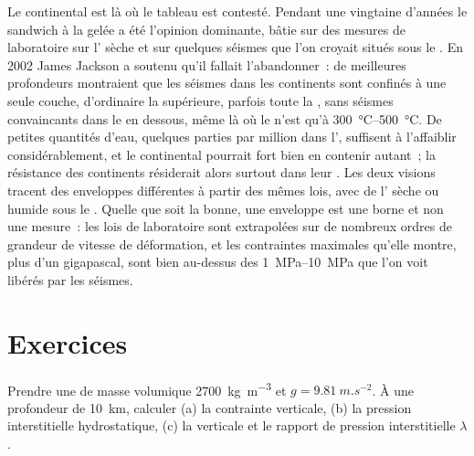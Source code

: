 Le  continental est là où le tableau est contesté. Pendant une vingtaine
d'années le sandwich à la gelée a été l'opinion dominante, bâtie sur des mesures de laboratoire
sur l' sèche et sur quelques séismes que l'on croyait situés sous
le . En 2002 James Jackson a soutenu qu'il fallait l'abandonner~: de meilleures
profondeurs montraient que les séismes dans les continents sont confinés à une seule
couche, d'ordinaire la  supérieure, parfois toute la , sans séismes
convaincants dans le  en dessous, même là où le  n'est qu'à
\qtyrange{300}{500}{\degreeCelsius}. De petites quantités d'eau, quelques parties par
million dans l', suffisent à l'affaiblir considérablement, et le 
continental pourrait fort bien en contenir autant~; la résistance des continents résiderait alors
surtout dans leur . Les deux visions tracent des enveloppes différentes à partir des mêmes
lois, avec de l' sèche ou humide sous le .
Quelle que soit la bonne, une enveloppe est une borne et non une mesure~: les
lois de laboratoire sont extrapolées sur de nombreux ordres de grandeur de vitesse de déformation,
et les contraintes maximales qu'elle montre, plus d'un gigapascal, sont bien au-dessus des
\qtyrange{1}{10}{MPa} que l'on voit libérés par les séismes.

\section{Exercices}

\begin{exercise}[$\star$]\label{exo:b1:stress-strain-rheology:1}
Prendre une  de masse volumique \qty{2700}{kg.m^{-3}} et $g = \qty{9.81}{m.s^{-2}}$.
À une profondeur de \qty{10}{km}, calculer (a) la contrainte verticale, (b) la
pression interstitielle hydrostatique, (c) la  verticale et le
rapport de pression interstitielle $\lambda$.
\end{exercise}


